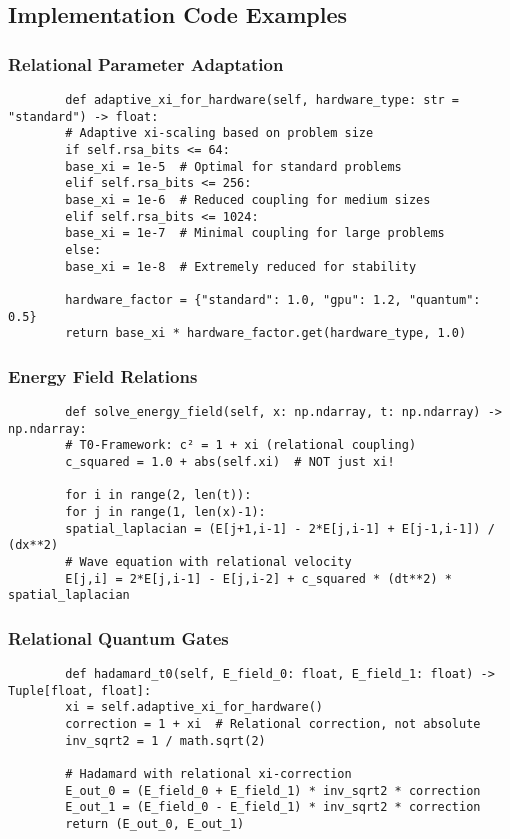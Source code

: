\documentclass[11pt,a4paper]{article}
\begin{document}
	\subsection{Implementation Code Examples}
	
	\subsubsection{Relational Parameter Adaptation}
	\begin{verbatim}
		def adaptive_xi_for_hardware(self, hardware_type: str = "standard") -> float:
		# Adaptive xi-scaling based on problem size
		if self.rsa_bits <= 64:
		base_xi = 1e-5  # Optimal for standard problems
		elif self.rsa_bits <= 256:
		base_xi = 1e-6  # Reduced coupling for medium sizes
		elif self.rsa_bits <= 1024:
		base_xi = 1e-7  # Minimal coupling for large problems
		else:
		base_xi = 1e-8  # Extremely reduced for stability
		
		hardware_factor = {"standard": 1.0, "gpu": 1.2, "quantum": 0.5}
		return base_xi * hardware_factor.get(hardware_type, 1.0)
	\end{verbatim}
	
	\subsubsection{Energy Field Relations}
	\begin{verbatim}
		def solve_energy_field(self, x: np.ndarray, t: np.ndarray) -> np.ndarray:
		# T0-Framework: c² = 1 + xi (relational coupling)
		c_squared = 1.0 + abs(self.xi)  # NOT just xi!
		
		for i in range(2, len(t)):
		for j in range(1, len(x)-1):
		spatial_laplacian = (E[j+1,i-1] - 2*E[j,i-1] + E[j-1,i-1]) / (dx**2)
		# Wave equation with relational velocity
		E[j,i] = 2*E[j,i-1] - E[j,i-2] + c_squared * (dt**2) * spatial_laplacian
	\end{verbatim}
	
	\subsubsection{Relational Quantum Gates}
	\begin{verbatim}
		def hadamard_t0(self, E_field_0: float, E_field_1: float) -> Tuple[float, float]:
		xi = self.adaptive_xi_for_hardware()
		correction = 1 + xi  # Relational correction, not absolute
		inv_sqrt2 = 1 / math.sqrt(2)
		
		# Hadamard with relational xi-correction
		E_out_0 = (E_field_0 + E_field_1) * inv_sqrt2 * correction
		E_out_1 = (E_field_0 - E_field_1) * inv_sqrt2 * correction
		return (E_out_0, E_out_1)
	\end{verbatim}
	
\end{document}
